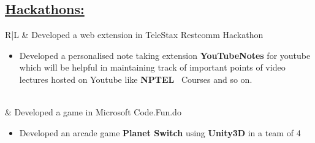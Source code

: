 \documentclass[a4paper, 11pt]{article}
\begin{document}
		\subsection*{\underline{Hackathons:}}
			\begin{tabularx}{\textwidth}{R|L}
				 & Developed a web extension in TeleStax Restcomm Hackathon 	
					\begin{minipage}[t]{0.7\textwidth}
						\begin{itemize}
							\item Developed a personalised note taking extension \textbf{YouTubeNotes} for youtube which will be helpful in maintaining track of important points of video lectures hosted on Youtube like \textbf{NPTEL} ~Courses and so on. 
						\end{itemize} 
					\end{minipage} \\ \addlinespace
				 & Developed a game in Microsoft Code.Fun.do
					\begin{minipage}[t]{0.7\textwidth}	
						\begin{itemize}
							\item Developed an arcade game \textbf{Planet Switch} using \textbf{Unity3D} in a team of 4
						\end{itemize}					
					\end{minipage}			 
			\end{tabularx}
\end{document}

